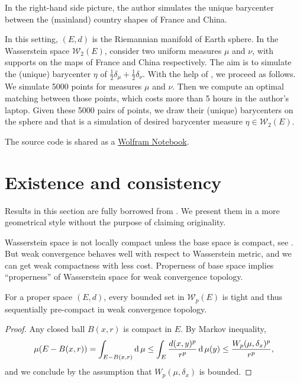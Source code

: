 In the right-hand side picture,
the author simulates the unique barycenter between the (mainland) country shapes of France and China.

\begin{example}
	\label{example:barycenter_sphere}
	In this setting, $(E, d)$ is the Riemannian manifold of Earth sphere.
	In the Wasserstein space $\mathcal{W}_2(E)$, consider two uniform measures $\mu$ and $\nu$,
	with supports on the maps of France and China respectively.
	The aim is to simulate the (unique) barycenter $\eta$ of $\frac{1}{2}\delta_\mu + \frac{1}{2}\delta_\nu$.
	With the help of , we proceed as follows.
	We simulate 5000 points for measures $\mu$ and $\nu$.
	Then we compute an optimal matching between those points,
	which costs more than 5 hours in the author's laptop.
	Given these 5000 pairs of points,
	we draw their (unique) barycenters on the sphere and that is a simulation of desired barycenter measure $\eta \in \mathcal{W}_2(E)$.
\end{example}

The source code is shared as a \href{https://www.wolframcloud.com/obj/jingmatrix/Published/OPT_sphere_country.nb}{Wolfram Notebook}.

\section{Existence and consistency}

Results in this section are fully borrowed from \cite{le2017existence}.
We present them in a more geometrical style without the purpose of claiming originality.

Wasserstein space is not locally compact unless the base space is compact, see \cite[Remark 7.1.9]{Ambrosio2005}.
But weak convergence behaves well with respect to Wasserstein metric, and we can get weak compactness with less cost.
Properness of base space implies ``properness'' of Wasserstein space for weak convergence topology.

\begin{prop}
	\label{prop:proper_weakly_convergence_topology}
	For a proper space $(E,d)$,
	every bounded set in $\mathcal{W}_p(E)$ is tight and thus
	sequentially	pre-compact in weak convergence topology.
\end{prop}

\begin{proof}
	Any closed ball $B(x,r)$ is compact in $E$.
	By Markov inequality,
	\[
		\mu(E - B(x,r)) = \int_{E - B(x,r)} \operatorname{d} \mu \leq
		\int_{E} \frac{d(x, y)^p}{r^p} \operatorname{d} \mu(y) \leq  \frac{W_p(\mu, \delta_x)^p}{r^p},
	\]
	and we conclude by the assumption that $W_p( \mu, \delta_x)$ is bounded.
\end{proof}


